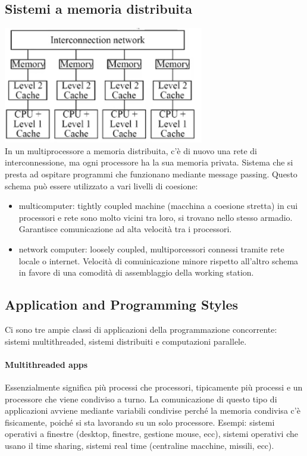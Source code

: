 \documentclass[10pt,a4paper]{book}
\begin{document}
\subsection{Sistemi a memoria distribuita}
\includegraphics[scale=1]{img/distrmem.png} \\
In un multiprocessore a memoria distribuita, c'è di nuovo una rete di interconnessione, ma ogni processore ha la sua memoria privata. Sistema che si presta ad ospitare programmi che funzionano mediante message passing. Questo schema può essere utilizzato a vari livelli di coesione: 
\begin{itemize}
\item multicomputer: tightly coupled machine (macchina a coesione stretta) in cui processori e rete sono molto vicini tra loro, si trovano nello stesso armadio. Garantisce comunicazione ad alta velocità tra i processori.
\item network computer: loosely coupled, multiporcessori connessi tramite rete locale o internet. Velocità di comuinicazione minore rispetto all'altro schema in favore di una comodità di assemblaggio della working station.
\end{itemize}

\subsection{Application and Programming Styles}
Ci sono tre ampie classi di applicazioni della programmazione concorrente: sistemi multithreaded, sistemi distribuiti e computazioni parallele.
\paragraph{Multithreaded apps} Essenzialmente significa più processi che processori, tipicamente più processi e un processore che viene condiviso a turno.
La comunicazione di questo tipo di applicazioni avviene mediante variabili condivise perché la memoria condivisa c'è fisicamente, poiché si sta lavorando su un solo processore.
Esempi: sistemi operativi a finestre (desktop, finestre, gestione mouse, ecc), sistemi operativi che usano il time sharing, sistemi real time (centraline macchine, missili, ecc).
\end{document}
